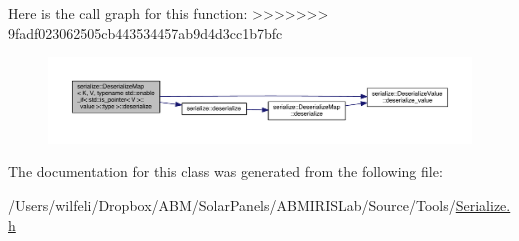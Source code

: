 Here is the call graph for this function\+:
\nopagebreak
>>>>>>> 9fadf023062505cb443534457ab9d4d3cc1b7bfc
\begin{figure}[H]
\begin{center}
\leavevmode
\includegraphics[width=350pt]{classserialize_1_1_deserialize_map_3_01_k_00_01_v_00_01typename_01std_1_1enable__if_3_01std_1_1ibe6cfa8a2d341f3a0942baedd95196d5_ad440b5c02ce0eb7839f46df2e95f93ee_cgraph}
\end{center}
\end{figure}




The documentation for this class was generated from the following file\+:\begin{DoxyCompactItemize}
\item 
/\+Users/wilfeli/\+Dropbox/\+A\+B\+M/\+Solar\+Panels/\+A\+B\+M\+I\+R\+I\+S\+Lab/\+Source/\+Tools/\hyperlink{_serialize_8h}{Serialize.\+h}\end{DoxyCompactItemize}
